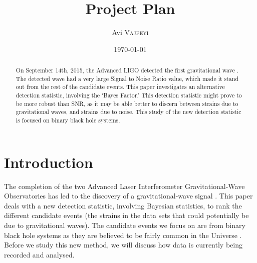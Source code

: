 \documentclass{article}
\title{Project Plan} %
\author{Avi \textsc{Vajpeyi}} %
\date{\today} %
\begin{document}
\maketitle %






 \begin{abstract}
On September 14th, 2015, the Advanced LIGO detected the first gravitational wave \cite{DetectionPaper}. The detected wave had a very large Signal to Noise Ratio value, which made it stand out from the rest of the candidate events. This paper investigates an alternative detection statistic, involving the `Bayes Factor.' This detection statistic might prove to be more robust than SNR, as it may be able better to discern between strains due to gravitational waves, and strains due to noise. This study of the new detection statistic is focused on binary black hole systems. 


\end{abstract}


\section{Introduction}




 \indent The completion of the two Advanced Laser Interferometer Gravitational-Wave Observatories has led to the discovery of a gravitational-wave signal \cite{DetectionPaper}. This paper deals with a new detection statistic, involving Bayesian statistics, to rank the different candidate events (the strains in the data sets that could potentially be due to gravitational waves). The candidate events we focus on are from binary black hole systems as they are believed to be fairly common in the Universe \cite{NumDetections}. Before we study this new method, we will discuss how data is currently being recorded and analysed.\\
 
\end{document}
